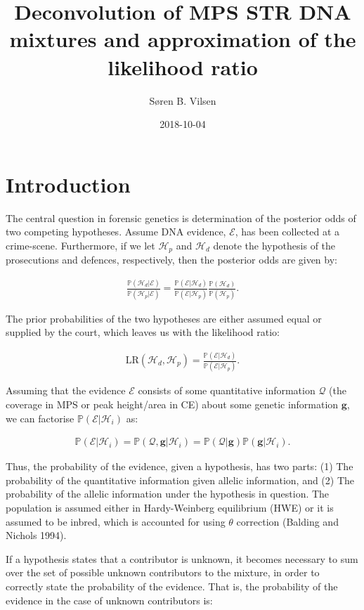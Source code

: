 \documentclass[]{article}
\title{Deconvolution of MPS STR DNA mixtures and approximation of the
likelihood ratio}
\author{Søren B. Vilsen}
\date{2018-10-04}
\newcommand{\bs}[1]{\ensuremath{\boldsymbol{#1}}}
\newcommand{\mc}[1]{\ensuremath{\mathcal{#1}}}
\newcommand{\mcg}{\ensuremath{g}}
\newcommand{\p}[1]{\ensuremath{\mathbb{P}\left(#1\right)}}
\begin{document}
\maketitle

\section{Introduction}\label{introduction}

The central question in forensic genetics is determination of the
posterior odds of two competing hypotheses. Assume DNA evidence,
\(\mc E\), has been collected at a crime-scene. Furthermore, if we let
\(\mc H_p\) and \(\mc H_d\) denote the hypothesis of the prosecutions
and defences, respectively, then the posterior odds are given by:

\begin{align}
\frac{\p{\mc H_d|\mc E}}{\p{\mc H_p|\mc E}} = \frac{\p{\mc E|\mc H_d}}{\p{\mc E|\mc H_p}}\frac{\p{\mc H_d}}{\p{\mc H_p}}.
\end{align}

The prior probabilities of the two hypotheses are either assumed equal
or supplied by the court, which leaves us with the likelihood ratio:

\begin{align}
\text{LR}(\mc H_d, \mc H_p) = \frac{\p{\mc E|\mc H_d}}{\p{\mc E|\mc H_p}}.
\end{align}

Assuming that the evidence \(\mc E\) consists of some quantitative
information \(\bs{\mc Q}\) (the coverage in MPS or peak height/area in
CE) about some genetic information \(\bs \mcg\), we can factorise
\(\p{\mc E|\mc H_i}\) as:

\begin{align}
\p{\mc E|\mc H_i} = \p{\bs{\mc Q}, \bs \mcg|\mc H_i} = \p{\bs{\mc Q}|\bs \mcg}\p{\bs \mcg|\mc H_i}.
\end{align}

Thus, the probability of the evidence, given a hypothesis, has two
parts: (1) The probability of the quantitative information given allelic
information, and (2) The probability of the allelic information under
the hypothesis in question. The population is assumed either in
Hardy-Weinberg equilibrium (HWE) or it is assumed to be inbred, which is
accounted for using \(\theta\) correction (Balding and Nichols 1994).

If a hypothesis states that a contributor is unknown, it becomes
necessary to sum over the set of possible unknown contributors to the
mixture, in order to correctly state the probability of the evidence.
That is, the probability of the evidence in the case of unknown
contributors is:
\end{document}
